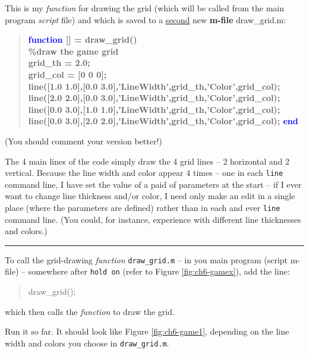 \documentclass{tufte-book} %
\newenvironment{docspec}{\begin{quotation}\ttfamily\parskip0pt\parindent0pt\ignorespaces}{\end{quotation}}
\newenvironment{docspecbold}{\begin{quotation}\ttfamily\bfseries\parskip0pt\parindent0pt\ignorespaces}{\end{quotation}}
\begin{document}
This is my \textit{function} for drawing the grid (which will be called from the main program \textit{script} file) and which is saved to a \uline{second} new \textbf{m-file} \textsf{draw\_grid.m}:
\begin{docspecbold}
\textcolor{blue}{function} [] = draw\_grid()\\
\textcolor[rgb]{0,0.501961,0}{\%draw the game grid\\}
grid\_th = 2.0;\\
grid\_col = [0 0 0];\\
line([1.0 1.0],[0.0 3.0],\textcolor[rgb]{1,0,1}{'LineWidth'},grid\_th,\textcolor[rgb]{1,0,1}{'Color'},grid\_col);\\
line([2.0 2.0],[0.0 3.0],\textcolor[rgb]{1,0,1}{'LineWidth'},grid\_th,\textcolor[rgb]{1,0,1}{'Color'},grid\_col);\\
line([0.0 3.0],[1.0 1.0],\textcolor[rgb]{1,0,1}{'LineWidth'},grid\_th,\textcolor[rgb]{1,0,1}{'Color'},grid\_col);\\
line([0.0 3.0],[2.0 2.0],\textcolor[rgb]{1,0,1}{'LineWidth'},grid\_th,\textcolor[rgb]{1,0,1}{'Color'},grid\_col);
\textcolor{blue}{end}
\end{docspecbold}
(You should comment your version better!) 

The 4 main lines of the code simply draw the 4 grid lines -- 2 horizontal and 2 vertical. Because the line width and color appear 4 times -- one in each \texttt{line} command line, I have set the value of a paid of parameters at the start -- if I ever want to change line thickness and/or color, I need only make an edit in a single place (where the parameters are defined) rather than in each and ever \texttt{line} command line. (You could, for instance, experience with different line thicknesses and colors.)

\vspace{1mm}
\noindent\rule{4cm}{0.5pt}
\vspace{2mm}

\noindent To call the grid-drawing \textit{function} \texttt{draw\_grid.m} -- in you main program (script \textsf{m-file}) -- somewhere after \texttt{hold on} (refer to Figure \ref{fig:ch6-gamex}), add the line:
\begin{docspec}
draw\_grid();
\end{docspec}
which then calls the \textit{function} to draw the grid.

Run it so far. It should look like Figure \ref{fig:ch6-game1}, depending on the line width and colors you choose in \texttt{draw\_grid.m}.
\end{document}
